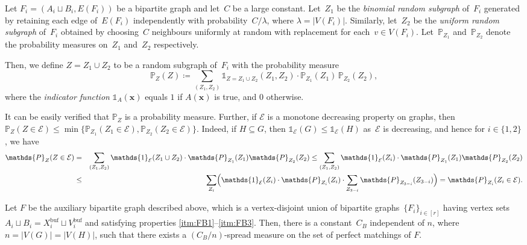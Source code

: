 \documentclass[10pt,a4paper]{amsart}
\newcommand{\buf}{\mathrm{buf}}
\begin{document}
\begin{definition}
    \label{defn:coupled_measure}
    Let $F_i = (A_i \sqcup B_i, E(F_i))$ be a bipartite graph and let~$C$ be a large constant. Let~$Z_1$ be the \emph{binomial random subgraph} of~$F_i$ generated by retaining each edge of~$E(F_i)$ independently with probability~$C/\lambda$, where $\lambda = |V(F_i)|$. Similarly, let~$Z_2$ be the \emph{uniform random subgraph} of~$F_i$ obtained by choosing~$C$ neighbours uniformly at random with replacement for each~$v \in V(F_i)$. Let~$\mathds{P}_{Z_1}$ and~$\mathds{P}_{Z_2}$ denote the probability measures on~$Z_1$ and~$Z_2$ respectively. 
    
    Then, we define $Z = Z_1 \cup Z_2$ to be a random subgraph of~$F_i$ with the probability measure 
    $$ \mathds{P}_Z(Z) \coloneqq \sum_{(Z_1, Z_2)} \mathds{1}_{Z = Z_1 \cup Z_2}(Z_1, Z_2) \cdot  \mathds{P}_{Z_1}(Z_1)\, \mathds{P}_{Z_2}(Z_2),$$ where the \emph{indicator function} $\mathds{1}_A(\mathbf{x})$ equals $1$ if $A(\mathbf{x})$ is true, and $0$ otherwise.
\end{definition} 

\begin{obs}
    \label{obs:coupling_prob}
    It can be easily verified that $\mathds{P}_Z$ is a probability measure. Further, if $\mathcal{E}$ is a monotone decreasing property on graphs, then $\mathds{P}_Z(Z \in \mathcal{E}) \leq \min\big\{ \mathds{P}_{Z_1}(Z_1 \in \mathcal{E}), \mathds{P}_{Z_2}(Z_2 \in \mathcal{E})\big\}$. Indeed, if $H \subseteq G$, then $\mathds{1}_{\mathcal{E}}(G) \leq \mathds{1}_{\mathcal{E}}(H)$ as~$\mathcal{E}$ is decreasing, and hence for $i \in \{1, 2\}$, we have
    \begin{eqnarray*}
        \mathds{P}_Z(Z \in \mathcal{E}) &=& \sum_{(Z_1, Z_2)} \mathds{1}_{\mathcal{E}}(Z_1 \cup Z_2) \cdot  \mathds{P}_{Z_1}(Z_1) \mathds{P}_{Z_2}(Z_2) \leq \sum_{(Z_1, Z_2)} \mathds{1}_{\mathcal{E}}(Z_i) \cdot \mathds{P}_{Z_1}(Z_1) \mathds{P}_{Z_2}(Z_2)\\
        &\leq& \sum_{Z_i} \Bigl(\mathds{1}_{\mathcal{E}}(Z_i) \cdot \mathds{P}_{Z_i}(Z_i)\cdot \sum_{Z_{3-i}} \mathds{P}_{Z_{3-i}}(Z_{3-i})\Bigr) = \mathds{P}_{Z_i}(Z_i \in \mathcal{E}). 
    \end{eqnarray*}   
\end{obs}

\begin{lemma}
    \label{lem:buf_spread_measure}
    Let $F$ be the auxiliary bipartite graph described above, which is a vertex-disjoint union of bipartite graphs~$\{F_i\}_{i \in [r]}$ having vertex sets~$A_i \sqcup B_i = X^{\buf}_i \sqcup V^{\buf}_i$ and satisfying properties \ref{itm:FB1}--\ref{itm:FB3}. Then, there is a constant~$C_B$ independent of $n$, where $n = |V(G)| = |V(H)|$, such that there exists a $(C_B/n)$-spread measure on the set of perfect matchings of $F$.    
\end{lemma}
\end{document}
